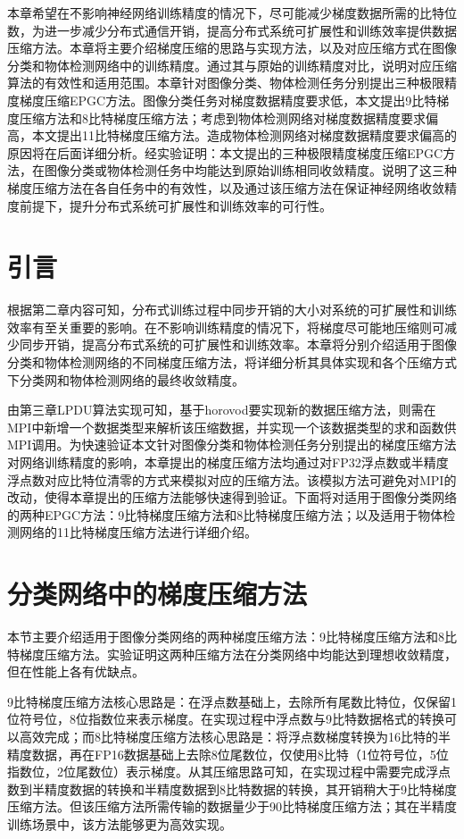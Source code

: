 本章希望在不影响神经网络训练精度的情况下，尽可能减少梯度数据所需的比特位数，为进一步减少分布式通信开销，提高分布式系统可扩展性和训练效率提供数据压缩方法。本章将主要介绍梯度压缩的思路与实现方法，以及对应压缩方式在图像分类和物体检测网络中的训练精度。通过其与原始的训练精度对比，说明对应压缩算法的有效性和适用范围。本章针对图像分类、物体检测任务分别提出三种极限精度梯度压缩EPGC方法。图像分类任务对梯度数据精度要求低，本文提出9比特梯度压缩方法和8比特梯度压缩方法；考虑到物体检测网络对梯度数据精度要求偏高，本文提出11比特梯度压缩方法。造成物体检测网络对梯度数据精度要求偏高的原因将在后面详细分析。经实验证明：本文提出的三种极限精度梯度压缩EPGC方法，在图像分类或物体检测任务中均能达到原始训练相同收敛精度。说明了这三种梯度压缩方法在各自任务中的有效性，以及通过该压缩方法在保证神经网络收敛精度前提下，提升分布式系统可扩展性和训练效率的可行性。
\section{引言}
根据第二章内容可知，分布式训练过程中同步开销的大小对系统的可扩展性和训练效率有至关重要的影响。在不影响训练精度的情况下，将梯度尽可能地压缩则可减少同步开销，提高分布式系统的可扩展性和训练效率。本章将分别介绍适用于图像分类和物体检测网络的不同梯度压缩方法，将详细分析其具体实现和各个压缩方式下分类网和物体检测网络的最终收敛精度。

由第三章LPDU算法实现可知，基于horovod要实现新的数据压缩方法，则需在MPI中新增一个数据类型来解析该压缩数据，并实现一个该数据类型的求和函数供MPI调用。为快速验证本文针对图像分类和物体检测任务分别提出的梯度压缩方法对网络训练精度的影响，本章提出的梯度压缩方法均通过对FP32浮点数或半精度浮点数对应比特位清零的方式来模拟对应的压缩方法。该模拟方法可避免对MPI的改动，使得本章提出的压缩方法能够快速得到验证。下面将对适用于图像分类网络的两种EPGC方法：9比特梯度压缩方法和8比特梯度压缩方法；以及适用于物体检测网络的11比特梯度压缩方法进行详细介绍。
\section{分类网络中的梯度压缩方法}
本节主要介绍适用于图像分类网络的两种梯度压缩方法：9比特梯度压缩方法和8比特梯度压缩方法。实验证明这两种压缩方法在分类网络中均能达到理想收敛精度，但在性能上各有优缺点。

9比特梯度压缩方法核心思路是：在浮点数基础上，去除所有尾数比特位，仅保留1位符号位，8位指数位来表示梯度。在实现过程中浮点数与9比特数据格式的转换可以高效完成；而8比特梯度压缩方法核心思路是：将浮点数梯度转换为16比特的半精度数据，再在FP16数据基础上去除8位尾数位，仅使用8比特（1位符号位，5位指数位，2位尾数位）表示梯度。从其压缩思路可知，在实现过程中需要完成浮点数到半精度数据的转换和半精度数据到8比特数据的转换，其开销稍大于9比特梯度压缩方法。但该压缩方法所需传输的数据量少于90比特梯度压缩方法；其在半精度训练场景中，该方法能够更为高效实现。
